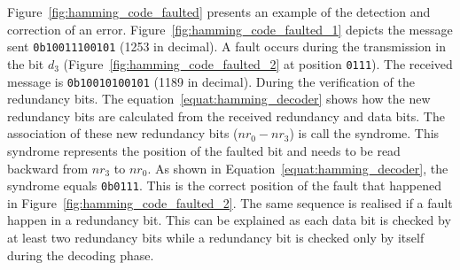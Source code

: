 Figure~\ref{fig:hamming_code_faulted} presents an example of the detection and correction of an error. Figure~\ref{fig:hamming_code_faulted_1} depicts the message sent \texttt{0b10011100101} (1253 in decimal). A fault occurs during the transmission in the bit $d_3$ (Figure~\ref{fig:hamming_code_faulted_2} at position \texttt{0111}). The received message is \texttt{0b10010100101} (1189 in decimal).
During the verification of the redundancy bits. The equation~\ref{equat:hamming_decoder} shows how the new redundancy bits are calculated from the received redundancy and data bits. The association of these new redundancy bits ($nr_{0}-nr_{3}$) is call the syndrome. This syndrome represents the position of the faulted bit and needs to be read backward from $nr_3$ to $nr_0$. As shown in Equation~\ref{equat:hamming_decoder}, the syndrome equals \texttt{0b0111}. This is the correct position of the fault that happened in Figure~\ref{fig:hamming_code_faulted_2}. The same sequence is realised if a fault happen in a redundancy bit. This can be explained as each data bit is checked by at least two redundancy bits while a redundancy bit is checked only by itself during the decoding phase.

